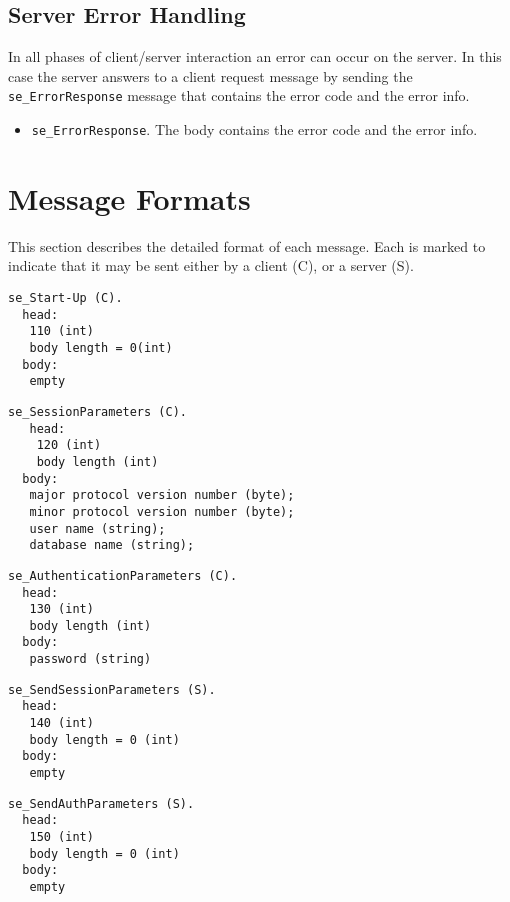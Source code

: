 \documentclass[a4paper,12pt]{article}
\newenvironment{citemize}
{\begin{itemize}
  \setlength{\itemsep}{0pt}
  \setlength{\parskip}{0pt}
  \setlength{\parsep}{0pt}}
{\end{itemize}}
\begin{document}
\subsection{Server Error Handling}

In all phases of client/server interaction an error can occur on the server. In
this case the server answers to a client request message by sending the
\verb!se_ErrorResponse! message that contains the error code and the error info.

\begin{citemize}
\item \verb!se_ErrorResponse!. The body contains the error code and the error
info.
\end{citemize}

\newpage

\section{Message Formats}
\label{sec:MessageFormats}

This section describes the detailed format of each message. Each is marked to
indicate that it may be sent either by a client (C), or a server (S).

\begin{verbatim}
se_Start-Up (C).
  head:
   110 (int)
   body length = 0(int)
  body:
   empty
\end{verbatim}

\begin{verbatim}
se_SessionParameters (C).
   head:
	120 (int)
	body length (int)
  body:
   major protocol version number (byte);
   minor protocol version number (byte);
   user name (string);
   database name (string);
\end{verbatim}

\begin{verbatim}
se_AuthenticationParameters (C).
  head:
   130 (int)
   body length (int)
  body:
   password (string)
\end{verbatim}

\begin{verbatim}
se_SendSessionParameters (S).
  head:
   140 (int)
   body length = 0 (int)
  body:
   empty
\end{verbatim}

\begin{verbatim}
se_SendAuthParameters (S).
  head:
   150 (int)
   body length = 0 (int)
  body:
   empty
\end{verbatim}
\end{document}
